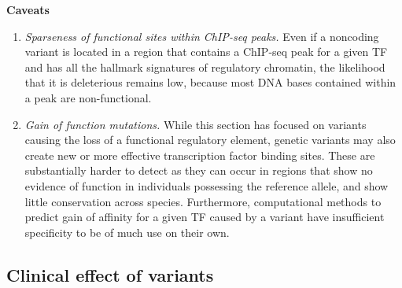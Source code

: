 \textbf{Caveats}
	\begin{enumerate}[label=\roman*]
	
	\item \textit{Sparseness of functional sites within ChIP-seq peaks.} Even if a noncoding variant is located in a region that contains a ChIP-seq peak for a given TF and has all the hallmark signatures of regulatory chromatin, the likelihood that it is deleterious remains low, because most DNA bases contained within a peak are non-functional. 
	
	\item \textit{Gain of function mutations.} While this section has focused on variants causing the loss of a functional regulatory element, genetic variants may also create new or more effective transcription factor binding sites. These are substantially harder to detect as they can occur in regions that show no evidence of function in individuals possessing the reference allele, and show little conservation across species. Furthermore, computational methods to predict gain of affinity for a given TF caused by a variant have insufficient specificity to be of much use on their own. 
	
	\end{enumerate}

\subsection{Clinical effect of variants}

